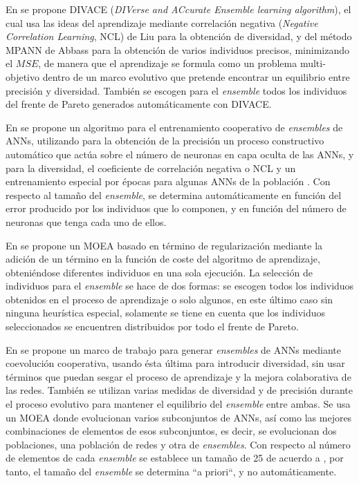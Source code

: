 En \cite{Chandra2006,Chandra2004} se propone DIVACE (\textit{DIVerse and ACcurate Ensemble
learning algorithm}), el cual usa las ideas del aprendizaje mediante
correlación negativa (\textit{Negative Correlation Learning}, NCL) de Liu \cite{Liu1999}
para la
obtención de diversidad, y del método MPANN de Abbass \cite{Abbass2001,Abbass2003b} para
la obtención de varios individuos precisos, minimizando el $MSE$, de manera que el
aprendizaje se formula como un problema multi-objetivo dentro de un marco
evolutivo que pretende encontrar un equilibrio entre precisión y diversidad. También se
escogen para el \textit{ensemble} todos los individuos del frente de Pareto generados
automáticamente con DIVACE.

En \cite{Islam2003} se propone un algoritmo para
el entrenamiento cooperativo de \textit{ensembles} de ANNs, utilizando para la obtención
de la
precisión un proceso constructivo automático que actúa sobre el número de neuronas en capa
oculta de las ANNs, y para la diversidad, el coeficiente de correlación negativa o NCL y
un entrenamiento especial por épocas para algunas ANNs de la población \cite{Liu1999}.
Con respecto al tamaño del \textit{ensemble}, se determina automáticamente en función
del error producido por los individuos que lo componen, y en función del número de
neuronas que tenga cada uno de ellos.

En \cite{Jin2004} se propone un MOEA basado en término de regularización mediante la
adición de un término en la función de coste del algoritmo de aprendizaje, obteniéndose
diferentes individuos en una sola ejecución. La selección de individuos para el
\textit{ensemble} se hace de dos formas: se escogen todos los individuos obtenidos en el
proceso de aprendizaje o solo algunos, en este último caso sin ninguna heurística
especial, solamente se tiene en cuenta que los individuos seleccionados se encuentren
distribuidos por todo el frente de Pareto.

En \cite{Pedrajas2005} se propone un marco de trabajo para generar \textit{ensembles} de
ANNs mediante coevolución cooperativa, usando ésta última para introducir diversidad, sin
usar términos que puedan sesgar el proceso de aprendizaje y la mejora colaborativa de las
redes. También se utilizan varias medidas de diversidad y de precisión durante el proceso
evolutivo para mantener el equilibrio del \textit{ensemble} entre ambas. Se usa un
MOEA donde evolucionan varios subconjuntos de ANNs, así como las mejores
combinaciones de elementos de esos subconjuntos, es decir, se evolucionan dos
poblaciones, una población de redes y otra de \textit{ensembles}. Con respecto al número
de elementos de cada \textit{ensemble} se establece un tamaño de 25 de acuerdo a
\cite{Opitz1999}, por tanto, el tamaño del \textit{ensemble} se determina ``a priori``, y
no automáticamente.

